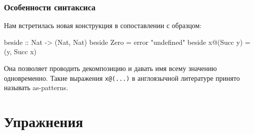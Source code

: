 \subsubsection{Особенности синтаксиса}

Нам встретилась новая конструкция в сопоставлении с образцом:

\begin{code}
beside :: Nat -> (Nat, Nat)
beside  Zero       = error "undefined"
beside  x@(Succ y) = (y, Succ x)
\end{code}

Она позволяет проводить декомпозицию и давать имя 
всему значению одновременно. Такие выражения \verb!x@(...)!
в англоязычной литературе принято называть as-patterns.

\section{Упражнения}

